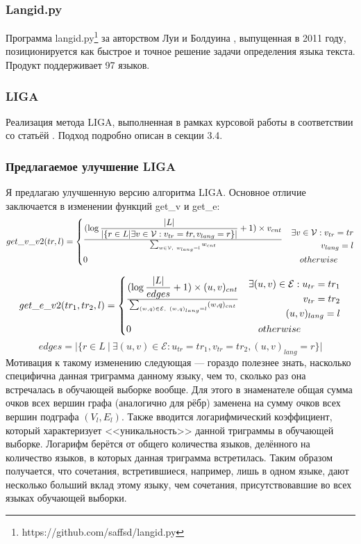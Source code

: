 \documentclass[a4paper, 14pt]{article}
\begin{document}
			\subsubsection{Langid.py}
			Программа langid.py\footnote{https://github.com/saffsd/langid.py} за авторством Луи и Болдуина \cite{langid}, выпущенная в 2011 году, позиционируется
			как быстрое и точное решение задачи определения языка текста. Продукт поддерживает 97 языков.
			\subsubsection{LIGA}
			Реализация метода LIGA, выполненная в рамках курсовой работы в соответствии со статьёй \cite{liga}. Подход подробно описан в секции 3.4.
			\subsubsection{Предлагаемое улучшение LIGA}
			Я предлагаю улучшенную версию алгоритма LIGA. Основное отличие заключается в изменении функций get\_v и get\_e:
			\[
 			get\_v\_v2(tr, l) =
 			  \begin{dcases}
  			   {(\log{|L| \over |\{r \in L | \exists v \in \mathcal{V}: v_{tr}=tr, v_{lang}=r\}|} + 1) \times  v_{cnt}} \over 
  			   \sum_{w \in \mathcal{V},\ w_{lang}=l} w_{cnt} & 
  			   \begin{split} 
						 \exists v \in \mathcal{V}: v_{tr}=tr \\ v_{lang}=l	
  			   	\end{split} \\
  			   0 & \quad otherwise
  			 \end{dcases}
			\]		
		
			\[
 			get\_e\_v2(tr_1, tr_2, l) =
 			  \begin{dcases}
  			   {(\log{|L| \over edges} + 1) \times (u, v)_{cnt}} 
  			   \over \sum_{(w, q) \in \mathcal{E},\ (w, q)_{lang}=l} (w, q)_{cnt} & 
  			    \begin{split} 
						 \exists (u, v) \in \mathcal{E}:  u_{tr}=tr_1 \\ v_{tr}=tr_2 \\ (u, v)_{lang}=l
  			   	\end{split} \\
  			   0 & \quad otherwise
  			 \end{dcases}
			\]	
			$$ edges = |\{r \in L \ | \ \exists (u, v) \in \mathcal{E}: u_{tr}=tr_1, v_{tr}=tr_2, (u, v)_{lang}=r\}| $$
			Мотивация к такому изменению следующая --- гораздо полезнее знать, насколько специфична данная триграмма данному языку, чем то, сколько раз
			 она встречалась в обучающей выборке вообще. Для этого в знаменателе общая сумма очков всех вершин графа (аналогично для рёбр) заменена 
			на сумму очков всех вершин подграфа $(V_{l}, E_{l})$. Также вводится логарифмический коэффициент, который характеризует <<уникальность>> данной триграммы в обучающей выборке. Логарифм берётся от общего количества языков, делённого на количество языков, в которых данная триграмма встретилась. Таким образом получается, что сочетания, встретившиеся, например, лишь в одном языке, дают несколько больший вклад этому языку, чем сочетания, присутствовавшие во всех языках обучающей выборки.
			
\end{document}
